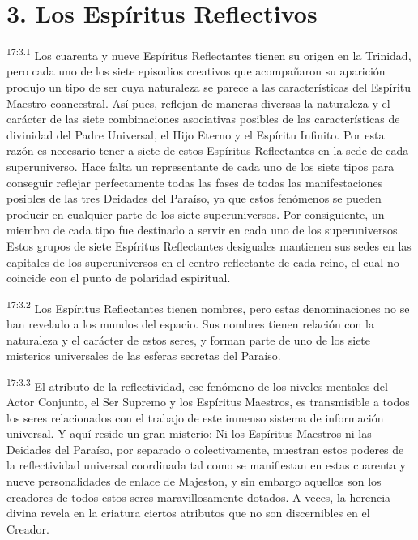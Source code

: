 \section*{3. Los Espíritus Reflectivos}
\par
\textsuperscript{17:3.1} Los cuarenta y nueve Espíritus Reflectantes tienen su origen en la Trinidad, pero cada uno de los siete episodios creativos que acompañaron su aparición produjo un tipo de ser cuya naturaleza se parece a las características del Espíritu Maestro coancestral. Así pues, reflejan de maneras diversas la naturaleza y el carácter de las siete combinaciones asociativas posibles de las características de divinidad del Padre Universal, el Hijo Eterno y el Espíritu Infinito. Por esta razón es necesario tener a siete de estos Espíritus Reflectantes en la sede de cada superuniverso. Hace falta un representante de cada uno de los siete tipos para conseguir reflejar perfectamente todas las fases de todas las manifestaciones posibles de las tres Deidades del Paraíso, ya que estos fenómenos se pueden producir en cualquier parte de los siete superuniversos. Por consiguiente, un miembro de cada tipo fue destinado a servir en cada uno de los superuniversos. Estos grupos de siete Espíritus Reflectantes desiguales mantienen sus sedes en las capitales de los superuniversos en el centro reflectante de cada reino, el cual no coincide con el punto de polaridad espiritual.

\par
\textsuperscript{17:3.2} Los Espíritus Reflectantes tienen nombres, pero estas denominaciones no se han revelado a los mundos del espacio. Sus nombres tienen relación con la naturaleza y el carácter de estos seres, y forman parte de uno de los siete misterios universales de las esferas secretas del Paraíso.

\par
\textsuperscript{17:3.3} El atributo de la reflectividad, ese fenómeno de los niveles mentales del Actor Conjunto, el Ser Supremo y los Espíritus Maestros, es transmisible a todos los seres relacionados con el trabajo de este inmenso sistema de información universal. Y aquí reside un gran misterio: Ni los Espíritus Maestros ni las Deidades del Paraíso, por separado o colectivamente, muestran estos poderes de la reflectividad universal coordinada tal como se manifiestan en estas cuarenta y nueve personalidades de enlace de Majeston, y sin embargo aquellos son los creadores de todos estos seres maravillosamente dotados. A veces, la herencia divina revela en la criatura ciertos atributos que no son discernibles en el Creador.

